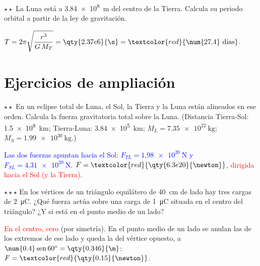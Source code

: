 \begin{exercise}
    \(\star\star\) La Luna está a \qty{3.84e8}{\m} del centro de la Tierra. Calcula su periodo orbital a partir de la ley de gravitación.
    \begin{solu}
        \(T = 2\pi\sqrt{\dfrac{r^3}{G\,M_T}} = \qty{2.37e6}{\s} = \textcolor{red}{\num{27.4}~\text{días}}\).
    \end{solu}
\end{exercise}

\section{Ejercicios de ampliación}\label{sec:ud11-ampliacion}

\begin{exercise}
    \(\star\star\) En un eclipse total de Luna, el Sol, la Tierra y la Luna están alineados en ese orden. Calcula la fuerza gravitatoria
    total sobre la Luna. (Distancia Tierra-Sol: \qty{1.5e8}{\km}; Tierra-Luna: \qty{3.84e5}{\km}; \(M_L = \qty{7.35e22}{\kg}\);
    \(M_S = \qty{1.99e30}{\kg}\).)
    \begin{solu}
        \textcolor{blue}{Las dos fuerzas apuntan hacia el Sol: \(F_{TL} = \qty{1.98e20}{\newton}\) y \(F_{SL} = \qty{4.31e20}{\newton}\).}
        \(F = \textcolor{red}{\qty{6.3e20}{\newton}}\), \textcolor{red}{dirigida hacia el Sol (y la Tierra)}.
    \end{solu}
\end{exercise}

\begin{exercise}
    \(\star\star\star\) En los vértices de un triángulo equilátero de \qty{40}{\cm} de lado hay tres cargas de \qty{+2}{\micro\coulomb}.
    ¿Qué fuerza actúa sobre una carga de \qty{+1}{\micro\coulomb} situada en el centro del triángulo? ¿Y si está en el punto medio de
    un lado?
    \begin{solu}
        \textcolor{red}{En el centro, cero} (por simetría). En el punto medio de un lado se anulan las de los extremos de ese lado y queda
        la del vértice opuesto, a \(\num{0.4}\sen 60^\circ = \qty{0.346}{\m}\): \(F = \textcolor{red}{\qty{0.15}{\newton}}\).
    \end{solu}
\end{exercise}

